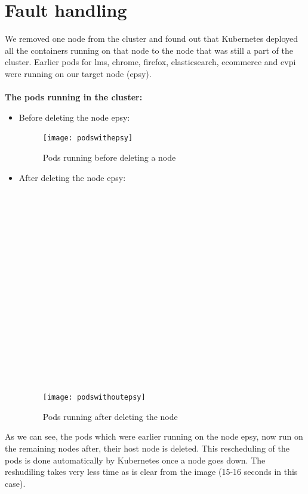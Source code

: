 \documentclass[12pt]{report}
\begin{document}
\section{Fault handling}
We removed one node from the cluster and found out that Kubernetes deployed all the containers running on that node to the node that was still a part of the cluster. Earlier pods for lms, chrome, firefox, elasticsearch, ecommerce and evpi were running on our target node (epsy).\\\\
\textbf{The pods running in the cluster:}
\begin{itemize}
	\item Before deleting the node epsy: 
		\begin{figure}[h!]
			\begin{center}
				\texttt{[image: podswithepsy]}
				\caption{Pods running before deleting a node}
			\end{center}
		\end{figure}
	\item After deleting the node epsy:\\\\\\\\\\\\\\\\\\\\\\\\\\\\\\\\\\\\
		\begin{figure}[h!]
			\begin{center}
				\texttt{[image: podswithoutepsy]}
				\caption{Pods running after deleting the node}
			\end{center}
		\end{figure}
\end{itemize}
As we can see, the pods which were earlier running on the node epsy, now run on the remaining nodes after, their host node is deleted. This rescheduling of the pods is done automatically by Kubernetes once a node goes down. The reshudiling takes very less time as is clear from the image (15-16 seconds in this case). 
\end{document}
